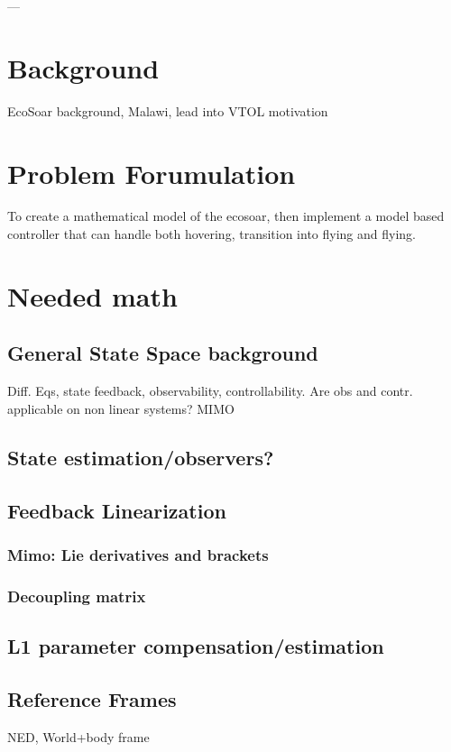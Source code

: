 \documentclass{article}
\begin{document}
\newpage

\tableofcontents

\newpage

\newpage



---

\section{Background}
EcoSoar background, Malawi, lead into VTOL motivation

\section{Problem Forumulation}
To create a mathematical model of the ecosoar, then implement a model based controller that can handle both hovering, transition into flying and flying.

\section{Needed math}
\subsection{General State Space background}
Diff. Eqs, state feedback, observability, controllability.
Are obs and contr. applicable on non linear systems?
MIMO
\subsection{State estimation/observers?}
\subsection{Feedback Linearization}
\subsubsection{Mimo: Lie derivatives and brackets}
\subsubsection{Decoupling matrix}
\subsection{L1 parameter compensation/estimation}
\subsection{Reference Frames}
NED, World+body frame
\end{document}
